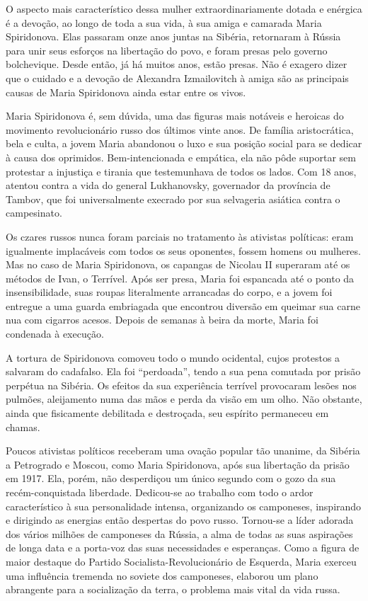 O aspecto mais característico dessa mulher extraordinariamente dotada e
enérgica é a devoção, ao longo de toda a sua vida, à sua amiga e
camarada Maria Spiridonova. Elas passaram onze anos juntas na Sibéria,
retornaram à Rússia para unir seus esforços na libertação do povo, e
foram presas pelo governo bolchevique. Desde então, já há muitos anos,
estão presas. Não é exagero dizer que o cuidado e a devoção de Alexandra
Izmailovitch à amiga são as principais causas de Maria Spiridonova ainda
estar entre os vivos.

Maria Spiridonova é, sem dúvida, uma das figuras mais notáveis ​​e
heroicas do movimento revolucionário russo dos últimos vinte anos. De
família aristocrática, bela e culta, a jovem Maria abandonou o luxo e
sua posição social para se dedicar à causa dos oprimidos.
Bem-intencionada e empática, ela não pôde suportar sem protestar a
injustiça e tirania que testemunhava de todos os lados. Com 18 anos,
atentou contra a vida do general Lukhanovsky, governador da província de
Tambov, que foi universalmente execrado por sua selvageria asiática
contra o campesinato.

Os czares russos nunca foram parciais no tratamento às ativistas
políticas: eram igualmente implacáveis ​​com todos os seus oponentes,
fossem homens ou mulheres. Mas no caso de Maria Spiridonova, os capangas
de Nicolau II superaram até os métodos de Ivan, o Terrível. Após ser
presa, Maria foi espancada até o ponto da insensibilidade, suas roupas
literalmente arrancadas do corpo, e a jovem foi entregue a uma guarda
embriagada que encontrou diversão em queimar sua carne nua com cigarros
acesos. Depois de semanas à beira da morte, Maria foi condenada à
execução.

A tortura de Spiridonova comoveu todo o mundo ocidental, cujos protestos
a salvaram do cadafalso. Ela foi ``perdoada'', tendo a sua pena comutada
por prisão perpétua na Sibéria. Os efeitos da sua experiência terrível
provocaram lesões nos pulmões, aleijamento numa das mãos e perda da
visão em um olho. Não obstante, ainda que fisicamente debilitada e
destroçada, seu espírito permaneceu em chamas.

Poucos ativistas políticos receberam uma ovação popular tão unanime, da
Sibéria a Petrogrado e Moscou, como Maria Spiridonova, após sua
libertação da prisão em 1917. Ela, porém, não desperdiçou um único
segundo com o gozo da sua recém-conquistada liberdade. Dedicou-se ao
trabalho com todo o ardor característico à sua personalidade intensa,
organizando os camponeses, inspirando e dirigindo as energias então
despertas do povo russo. Tornou-se a líder adorada dos vários milhões de
camponeses da Rússia, a alma de todas as suas aspirações de longa data e
a porta-voz das suas necessidades e esperanças. Como a figura de maior
destaque do Partido Socialista-Revolucionário de Esquerda, Maria exerceu
uma influência tremenda no soviete dos camponeses, elaborou um plano
abrangente para a socialização da terra, o problema mais vital da vida
russa.

